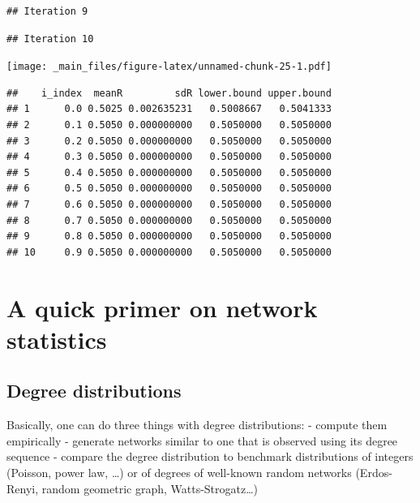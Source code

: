 \documentclass[
]{book}
\theoremstyle{definition}
\theoremstyle{definition}
\theoremstyle{definition}
\theoremstyle{definition}
\theoremstyle{remark}
\begin{document}
\begin{verbatim}
## Iteration 9
\end{verbatim}

\begin{verbatim}
## Iteration 10
\end{verbatim}

\texttt{[image: \_main\_files/figure-latex/unnamed-chunk-25-1.pdf]}

\begin{verbatim}
##    i_index  meanR         sdR lower.bound upper.bound
## 1      0.0 0.5025 0.002635231   0.5008667   0.5041333
## 2      0.1 0.5050 0.000000000   0.5050000   0.5050000
## 3      0.2 0.5050 0.000000000   0.5050000   0.5050000
## 4      0.3 0.5050 0.000000000   0.5050000   0.5050000
## 5      0.4 0.5050 0.000000000   0.5050000   0.5050000
## 6      0.5 0.5050 0.000000000   0.5050000   0.5050000
## 7      0.6 0.5050 0.000000000   0.5050000   0.5050000
## 8      0.7 0.5050 0.000000000   0.5050000   0.5050000
## 9      0.8 0.5050 0.000000000   0.5050000   0.5050000
## 10     0.9 0.5050 0.000000000   0.5050000   0.5050000
\end{verbatim}

\section{A quick primer on network statistics}\label{a-quick-primer-on-network-statistics}

\subsection{Degree distributions}\label{degree-distributions}

Basically, one can do three things with degree distributions:
- compute them empirically
- generate networks similar to one that is observed using its degree sequence
- compare the degree distribution to benchmark distributions of integers (Poisson, power law, \ldots) or of degrees of well-known random networks (Erdos-Renyi, random geometric graph, Watts-Strogatz\ldots)
\end{document}
